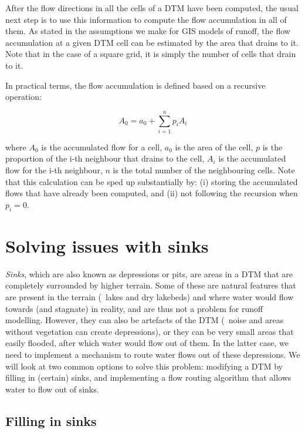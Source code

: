 After the flow directions in all the cells of a DTM have been computed, the usual next step is to use this information to compute the flow accumulation in all of them.
As stated in the assumptions we make for GIS models of runoff, the flow accumulation at a given DTM cell can be estimated by the area that drains to it.
Note that in the case of a square grid, it is simply the number of cells that drain to it.

In practical terms, the flow accumulation is defined based on a recursive operation:

\begin{equation}
A_0 = a_0 + \sum_{i=1}^{n} p_i A_i
\end{equation}

where \(A_0\) is the accumulated flow for a cell, \(a_0\) is the area of the cell, \(p\) is the proportion of the i-th neighbour that drains to the cell, \(A_i\) is the accumulated flow for the i-th neighbour, \(n\) is the total number of the neighbouring cells.
Note that this calculation can be sped up substantially by: (i) storing the accumulated flows that have already been computed, and (ii) not following the recursion when \(p_i = 0\).

\section{Solving issues with sinks}

\emph{Sinks}, which are also known as depressions or pits, are areas in a DTM that are completely surrounded by higher terrain.
Some of these are natural features that are present in the terrain (\eg\ lakes and dry lakebeds) and where water would flow towards (and stagnate) in reality, and are thus not a problem for runoff modelling.
However, they can also be artefacts of the DTM (\eg\ noise and areas without vegetation can create depressions), or they can be very small areas that easily flooded, after which water would flow out of them.
In the latter case, we need to implement a mechanism to route water flows out of these depressions.
We will look at two common options to solve this problem: modifying a DTM by filling in (certain) sinks, and implementing a flow routing algorithm that allows water to flow out of sinks.

\subsection{Filling in sinks}%

